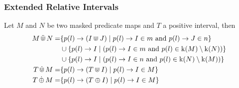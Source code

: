 \begin{frame}
    \frametitle{Extended Relative Intervals}

    \begin{definition}
        \label{def:e-rel-int-ops}
        Let $M$ and $N$ be two masked predicate maps and $T$ a positive interval, then 
        \begin{align*}
            M \,\ddot{\Cup}\, N = 
                & \{ p(l) \rightarrow (I \Cup J) \mid 
                    p(l) \rightarrow I \in m \text{ and } 
                    p(l) \rightarrow J \in n \} \\
                & \cup \{p(l) \rightarrow I \mid  
                    (p(l) \rightarrow I \in m \text{ and }
                    p(l) \in \operatorname{k}(M) \setminus \operatorname{k}(N)) \} \\
                & \cup \{p(l) \rightarrow I \mid  
                    (p(l) \rightarrow I \in n \text{ and }
                    p(l) \in \operatorname{k}(N) \setminus \operatorname{k}(M))
                    \} \\
            T \,\dot{\Cup}\, M = 
                & \{ p(l) \rightarrow (T \Cup I) \mid 
                    p(l) \rightarrow I \in M \} \\
            T \,\dot{\oplus}\, M = 
                & \{ p(l) \rightarrow (T \oplus I) \mid 
                    p(l) \rightarrow I \in M \} \\
        \end{align*}
    \end{definition}
    
\end{frame}

